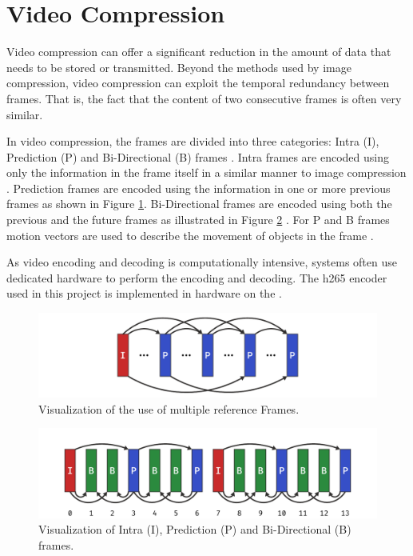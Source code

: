 \section{Video Compression}
Video compression can offer a significant reduction in the amount of data that needs to be stored or transmitted.
Beyond the methods used by image compression, video compression can exploit the temporal redundancy between frames.
That is, the fact that the content of two consecutive frames is often very similar.

In video compression, the frames are divided into three categories: Intra (I), Prediction (P) and Bi-Directional (B) frames \cite{vijayanagarBframesDifferencesUse2020}.
Intra frames are encoded using only the information in the frame itself in a similar manner to image compression \cite{vijayanagarBframesDifferencesUse2020}.
Prediction frames are encoded using the information in one or more previous frames as shown in Figure \ref{fig:multiple_reference_frames}.
Bi-Directional frames are encoded using both the previous and the future frames as illustrated in Figure \ref{fig:ipb_frames} \cite{vijayanagarBframesDifferencesUse2020}.
For P and B frames motion vectors are used to describe the movement of objects in the frame \cite{vijayanagarBframesDifferencesUse2020}.

As video encoding and decoding is computationally intensive, systems often use dedicated hardware to perform the encoding and decoding.
The \gls{h265} encoder used in this project is implemented in hardware on the \jx \cite[16]{nvidiaNVIDIAJetsonAGX2019}.

\begin{figure}
    \centering
    \includegraphics[width=\textwidth]{figures/encoding/multiple_references.pdf}
    \caption{Visualization of the use of multiple reference Frames.}
    \label{fig:multiple_reference_frames}
\end{figure}

\begin{figure}
    \centering
    \includegraphics[width=\textwidth]{figures/encoding/ipb_frames.pdf}
    \caption{Visualization of Intra (I), Prediction (P) and Bi-Directional (B) frames.}
    \label{fig:ipb_frames}
\end{figure}

